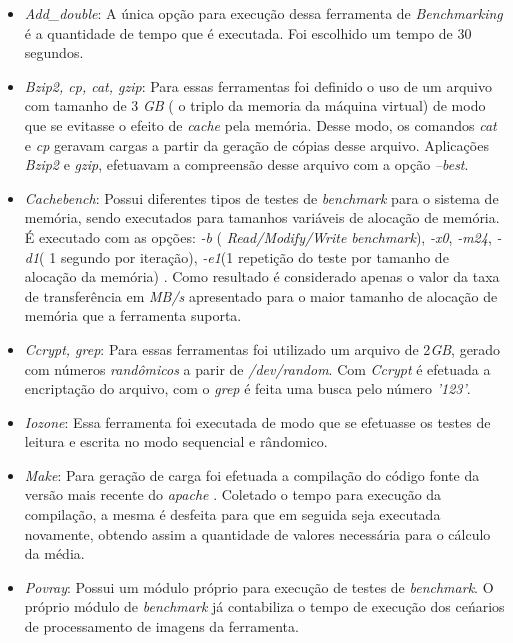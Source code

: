 \begin{itemize}
\item \textit{Add\_double}: A única opção para execução dessa ferramenta de \textit{Benchmarking} é a quantidade de tempo que é executada. Foi escolhido um tempo de 30 segundos.

\item \textit{Bzip2, cp, cat, gzip}: Para essas ferramentas foi definido o uso de um arquivo com tamanho de 3 \textit{GB} ( o triplo da memoria da máquina virtual) de modo que se evitasse o efeito de \textit{cache} pela memória. Desse modo, os comandos \textit{cat} e \textit{cp} geravam cargas a partir da geração de cópias desse arquivo. Aplicações \textit{Bzip2} e \textit{gzip}, efetuavam a compreensão desse arquivo com a opção \textit{--best}.

\item \textit{Cachebench}: Possui diferentes tipos de testes de \textit{benchmark} para o sistema de memória, sendo executados para tamanhos variáveis de alocação de memória. É executado com as opções: \textit{-b} ( \textit{Read/Modify/Write benchmark}), \textit{-x0}, \textit{-m24}, \textit{-d1}( 1 segundo por iteração), \textit{-e1}(1 repetição do teste por tamanho de alocação da memória) . Como resultado é considerado apenas o valor da taxa de transferência em \textit{MB/s} apresentado para o maior tamanho de alocação de memória que a ferramenta suporta.

\item  \textit{Ccrypt, grep}: Para essas ferramentas foi utilizado um arquivo de 2\textit{GB}, gerado com números \textit{randômicos} a parir de \textit{/dev/random}. Com \textit{Ccrypt} é efetuada a encriptação do arquivo, com o \textit{grep} é feita uma busca pelo número \textit{'123'}.

\item \textit{Iozone}: Essa ferramenta foi executada de modo que se efetuasse os testes de leitura e escrita no modo sequencial e rândomico.

\item \textit{Make}: Para geração de carga foi efetuada a compilação do código fonte da versão mais recente do \textit{apache} \footnotemark[12]                                                                                                                              . Coletado o tempo para execução da compilação, a mesma é desfeita para que em seguida seja executada novamente, obtendo assim a quantidade de valores necessária para o cálculo da média.

\item \textit{Povray}: Possui um módulo próprio para execução de testes de \textit{benchmark}. O próprio módulo de \textit{benchmark} já contabiliza o tempo de execução dos ceńarios de processamento de imagens da ferramenta. 

\end{itemize}

